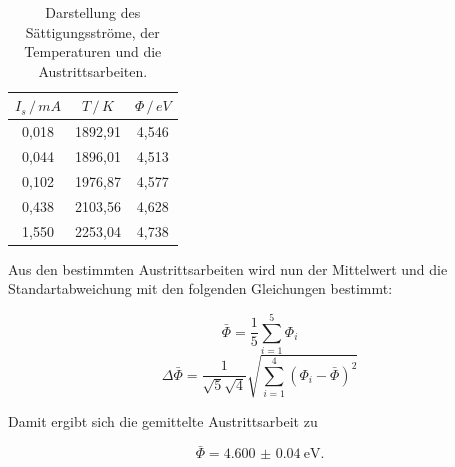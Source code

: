 \begin{table}[H]
  \centering
  \caption{Darstellung des Sättigungsströme, der Temperaturen und die Austrittsarbeiten.}
  \label{tab:5}
  \begin{tabular}{c c c}
    \toprule
    $I_s \, / \, mA$ & $T \, / \, K$ & $\Phi \, / \, eV$ \\
    \midrule
    0,018 & 1892,91 & 4,546 \\
    0,044 & 1896,01 & 4,513 \\
    0,102 & 1976,87 & 4,577 \\
    0,438 & 2103,56 & 4,628 \\
    1,550 & 2253,04 & 4,738 \\
    \bottomrule
  \end{tabular}
\end{table}

Aus den bestimmten Austrittsarbeiten wird nun der Mittelwert und die Standartabweichung
mit den folgenden Gleichungen bestimmt:

\begin{equation*}
    \bar{\Phi} = \frac{1}{5} \sum_{i=1}^{5} \Phi_i
\end{equation*}
\begin{equation*}
  \Delta \bar{\Phi} = \frac{1}{\sqrt{5}\sqrt{4}} \sqrt{\sum_{i=1}^{4}(\Phi_i-\bar{\Phi})^2}
\end{equation*}


Damit ergibt sich die gemittelte Austrittsarbeit zu

\begin{equation*}
  \bar{\Phi} = \SI{4.600(40)}{\eV}.
\end{equation*}
